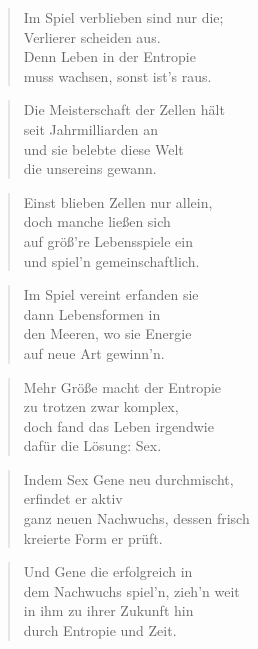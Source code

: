 \documentclass[10pt,a4paper]{article}
\begin{document}
\begin{multicols}{2}
\begin{verse}
Im Spiel verblieben sind nur die; \\
Verlierer scheiden aus. \\
Denn Leben in der Entropie \\
muss wachsen, sonst ist’s raus. \\
\end{verse}

\begin{verse}
Die Meisterschaft der Zellen hält \\
seit Jahrmilliarden an \\
und sie belebte diese Welt \\
die unsereins gewann. \\
\end{verse}

\begin{verse}
Einst blieben Zellen nur allein, \\
doch manche ließen sich \\
auf größ’re Lebensspiele ein \\
und spiel’n gemeinschaftlich. \\
\end{verse}

\begin{verse}
Im Spiel vereint erfanden sie \\
dann Lebensformen in \\
den Meeren, wo sie Energie \\
auf neue Art gewinn’n. \\
\end{verse}

\begin{verse}
Mehr Größe macht der Entropie \\
zu trotzen zwar komplex, \\
doch fand das Leben irgendwie \\
dafür die Lösung: Sex. \\
\end{verse}

\begin{verse}
Indem Sex Gene neu durchmischt, \\
erfindet er aktiv \\
ganz neuen Nachwuchs, dessen frisch \\
kreierte Form er prüft. \\
\end{verse}

\begin{verse}
Und Gene die erfolgreich in \\
dem Nachwuchs spiel’n, zieh’n weit \\
in ihm zu ihrer Zukunft hin \\
durch Entropie und Zeit. \\
\end{verse}


\end{multicols}
\end{document}
